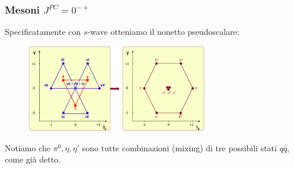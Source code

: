 \subsubsection{Mesoni $J^{PC}=0^{-+}$}
Specificatamente con $s$-wave otteniamo il nonetto pseudoscalare:
\begin{figure}[H]
    \centering
    \includegraphics[width=0.7\textwidth]{immagini/fig_pseudoscalar_mesons.png}
  \end{figure}
  Notiamo che $\pi^0,\eta,\eta'$ sono tutte combinazioni (mixing) di tre possibili stati $q\bar q$, come già detto.
